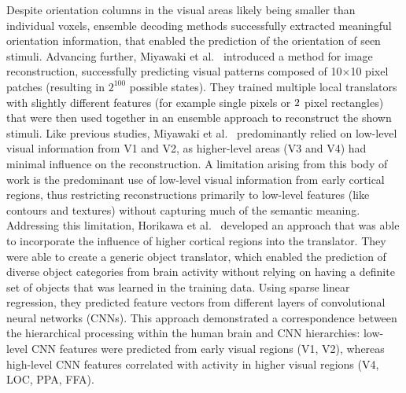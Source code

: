 Despite orientation columns in the visual areas likely being smaller than individual voxels, ensemble decoding methods successfully extracted meaningful orientation information, that enabled the prediction of the orientation of seen stimuli. Advancing further, Miyawaki et al.~\cite{miyawakiVisualImageReconstruction2008} introduced a method for image reconstruction, successfully predicting visual patterns composed of 10$\times$10 pixel patches (resulting in $2^{100}$ possible states). They trained multiple local translators with slightly different features (for example single pixels or $2\time1$ pixel rectangles) that were then used together in an ensemble approach to reconstruct the shown stimuli. Like previous studies, Miyawaki et al.~ predominantly relied on low-level visual information from V1 and V2, as higher-level areas (V3 and V4) had minimal influence on the reconstruction. 
A limitation arising from this body of work is the predominant use of low-level visual information from early cortical regions, thus restricting reconstructions primarily to low-level features (like contours and textures) without capturing much of the semantic meaning. Addressing this limitation, Horikawa et al.~\cite{horikawaGenericDecodingSeen2017} developed an approach that was able to incorporate the influence of higher cortical regions into the translator. They were able to create a generic object translator, which enabled the prediction of diverse object categories from brain activity without relying on having a definite set of objects that was learned in the training data. Using sparse linear regression, they predicted feature vectors from different layers of convolutional neural networks (CNNs). This approach demonstrated a correspondence between the hierarchical processing within the human brain and CNN hierarchies: low-level CNN features were predicted from early visual regions (V1, V2), whereas high-level CNN features correlated with activity in higher visual regions (V4, LOC, PPA, FFA).

